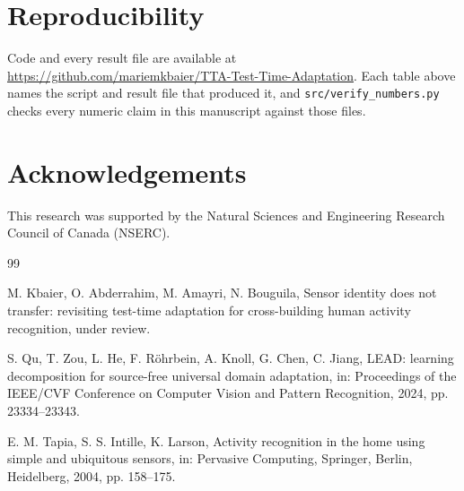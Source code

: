 \documentclass[a4paper,fleqn]{cas-dc}
\begin{document}


\section*{Reproducibility}

Code and every result file are available at
\url{https://github.com/mariemkbaier/TTA-Test-Time-Adaptation}. Each table above names
the script and result file that produced it, and
\texttt{src/verify\_numbers.py} checks every numeric claim in this manuscript against
those files.

\section*{Acknowledgements}

This research was supported by the Natural Sciences and Engineering Research Council of
Canada (NSERC).

\begin{thebibliography}{99}

 M. Kbaier, O. Abderrahim, M. Amayri, N. Bouguila, Sensor
identity does not transfer: revisiting test-time adaptation for cross-building human
activity recognition, under review.

 S. Qu, T. Zou, L. He, F. R\"ohrbein, A. Knoll, G. Chen, C. Jiang, LEAD:
learning decomposition for source-free universal domain adaptation, in: Proceedings of
the IEEE/CVF Conference on Computer Vision and Pattern Recognition, 2024,
pp. 23334--23343.

 E. M. Tapia, S. S. Intille, K. Larson, Activity recognition in the
home using simple and ubiquitous sensors, in: Pervasive Computing, Springer, Berlin,
Heidelberg, 2004, pp. 158--175.

\end{thebibliography}
\end{document}
